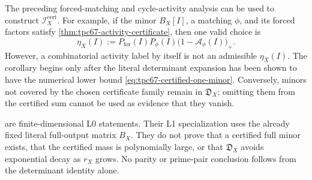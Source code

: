 \begin{remark}
\label{rem:tpc67-activity-needs-minor-bound}
The preceding forced-matching and cycle-activity analysis can be used to
construct \(\mathscr I_X^{\mathrm{cert}}\).  For example, if the minor
\(B_X[I]\), a matching \(\phi\), and its forced factors satisfy
\cref{thm:tpc67-activity-certificate}, then one valid choice is
\begin{equation}
 \eta_X(I)
 :=
 P_{\mathrm{for}}(I)P_\phi(I)
 \bigl(1-\mathcal A_\phi(I)\bigr)_+.
 \label{eq:tpc67-activity-certified-eta}
\end{equation}
However, a combinatorial activity label by itself is not an admissible
\(\eta_X(I)\).  The corollary begins only after the literal determinant
expansion has been shown to have the numerical lower bound
\eqref{eq:tpc67-certified-one-minor}.  Conversely, minors not covered by
the chosen certificate family remain in \(\mathfrak D_X\); omitting them
from the certified sum cannot be used as evidence that they vanish.
\end{remark}

\begin{remark}
\label{rem:tpc67-determinant-mass-claim-level}
are finite-dimensional L0 statements.
Their L1 specialization uses the already fixed literal full-output
matrix \(B_X\).  They do not prove that a certified full minor exists,
that the certified mass is polynomially large, or that
\(\mathfrak D_X\) avoids exponential decay as \(r_X\) grows.  No parity
or prime-pair conclusion follows from the determinant identity alone.
\end{remark}

